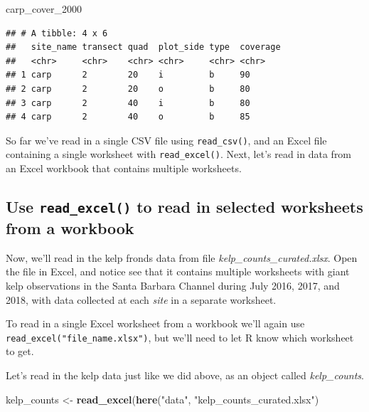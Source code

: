 \documentclass[]{book}
\newenvironment{Shaded}{\begin{snugshade}}{\end{snugshade}}
\newcommand{\DecValTok}[1]{\textcolor[rgb]{0.00,0.00,0.81}{#1}}
\newcommand{\KeywordTok}[1]{\textcolor[rgb]{0.13,0.29,0.53}{\textbf{#1}}}
\newcommand{\NormalTok}[1]{#1}
\newcommand{\StringTok}[1]{\textcolor[rgb]{0.31,0.60,0.02}{#1}}
\begin{document}
\begin{Shaded}
\begin{Highlighting}[]
\NormalTok{carp_cover_}\DecValTok{2000}
\end{Highlighting}
\end{Shaded}

\begin{verbatim}
## # A tibble: 4 x 6
##   site_name transect quad  plot_side type  coverage
##   <chr>     <chr>    <chr> <chr>     <chr> <chr>   
## 1 carp      2        20    i         b     90      
## 2 carp      2        20    o         b     80      
## 3 carp      2        40    i         b     80      
## 4 carp      2        40    o         b     85
\end{verbatim}

So far we've read in a single CSV file using \texttt{read\_csv()}, and an Excel file containing a single worksheet with \texttt{read\_excel()}. Next, let's read in data from an Excel workbook that contains multiple worksheets.

\hypertarget{use-read_excel-to-read-in-selected-worksheets-from-a-workbook}{%
\subsection{\texorpdfstring{Use \texttt{read\_excel()} to read in selected worksheets from a workbook}{Use read\_excel() to read in selected worksheets from a workbook}}\label{use-read_excel-to-read-in-selected-worksheets-from-a-workbook}}

Now, we'll read in the kelp fronds data from file \emph{kelp\_counts\_curated.xlsx}. Open the file in Excel, and notice see that it contains multiple worksheets with giant kelp observations in the Santa Barbara Channel during July 2016, 2017, and 2018, with data collected at each \emph{site} in a separate worksheet.

To read in a single Excel worksheet from a workbook we'll again use \texttt{read\_excel("file\_name.xlsx")}, but we'll need to let R know which worksheet to get.

Let's read in the kelp data just like we did above, as an object called \emph{kelp\_counts}.

\begin{Shaded}
\begin{Highlighting}[]
\NormalTok{kelp_counts <-}\StringTok{ }\KeywordTok{read_excel}\NormalTok{(}\KeywordTok{here}\NormalTok{(}\StringTok{"data"}\NormalTok{, }\StringTok{"kelp_counts_curated.xlsx"}\NormalTok{)}
\end{Highlighting}
\end{Shaded}
\end{document}
